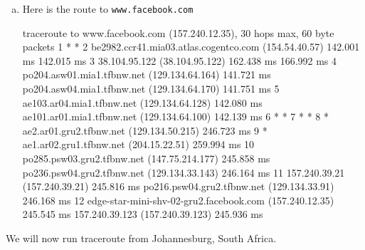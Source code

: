 \documentclass{article}
\begin{document}
\begin{enumerate}[a.]
\item Here is the route to {\tt www.facebook.com}
\begin{code}
traceroute to www.facebook.com (157.240.12.35), 30 hops max, 60 byte packets
 1  * *
 2  be2982.ccr41.mia03.atlas.cogentco.com (154.54.40.57)  142.001 ms  142.015 ms
 3  38.104.95.122 (38.104.95.122)  162.438 ms  166.992 ms
 4  po204.asw01.mia1.tfbnw.net (129.134.64.164)  141.721 ms po204.asw04.mia1.tfbnw.net (129.134.64.170)  141.751 ms
 5  ae103.ar04.mia1.tfbnw.net (129.134.64.128)  142.080 ms ae101.ar01.mia1.tfbnw.net (129.134.64.100)  142.139 ms
 6  * *
 7  * *
 8  * ae2.ar01.gru2.tfbnw.net (129.134.50.215)  246.723 ms
 9  * ae1.ar02.gru1.tfbnw.net (204.15.22.51)  259.994 ms
10  po285.psw03.gru2.tfbnw.net (147.75.214.177)  245.858 ms po236.psw04.gru2.tfbnw.net (129.134.33.143)  246.164 ms
11  157.240.39.21 (157.240.39.21)  245.816 ms po216.psw04.gru2.tfbnw.net (129.134.33.91)  246.168 ms
12  edge-star-mini-shv-02-gru2.facebook.com (157.240.12.35)  245.545 ms 157.240.39.123 (157.240.39.123)  245.936 ms
\end{code}
\end{enumerate}

We will now run traceroute from Johannesburg, South Africa.
\end{document}
